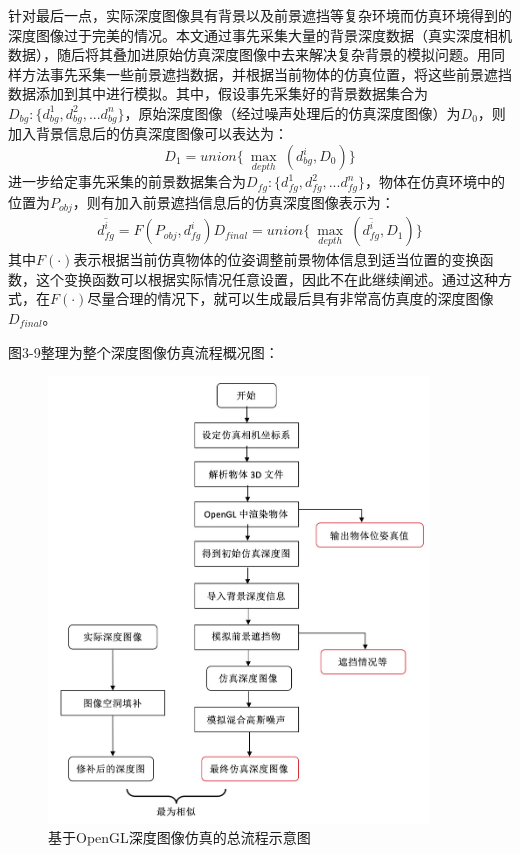针对最后一点，实际深度图像具有背景以及前景遮挡等复杂环境而仿真环境得到的深度图像过于完美的情况。本文通过事先采集大量的背景深度数据（真实深度相机数据），随后将其叠加进原始仿真深度图像中去来解决复杂背景的模拟问题。用同样方法事先采集一些前景遮挡数据，并根据当前物体的仿真位置，将这些前景遮挡数据添加到其中进行模拟。其中，假设事先采集好的背景数据集合为$D_{bg}:\{d_{bg}^1,d_{bg}^2,...d_{bg}^n\}$，原始深度图像（经过噪声处理后的仿真深度图像）为$D_0$，则加入背景信息后的仿真深度图像可以表达为：
\begin{equation}
	D_1=union\{\ \max_{depth}\ (d_{bg}^i, D_0)\}
\end{equation}
进一步给定事先采集的前景数据集合为$D_{fg}:\{d_{fg}^1,d_{fg}^2,...d_{fg}^n\}$，物体在仿真环境中的位置为$P_{obj}$，则有加入前景遮挡信息后的仿真深度图像表示为：
\begin{equation}
\begin{aligned}
	\overline{d_{fg}^i} = F(P_{obj},d_{fg}^i)
	D_{final}=union\{\ \max_{depth}\ (\overline{d_{fg}^i}, D_1)\}
\end{aligned}
\end{equation}
其中$F(\cdot)$表示根据当前仿真物体的位姿调整前景物体信息到适当位置的变换函数，这个变换函数可以根据实际情况任意设置，因此不在此继续阐述。通过这种方式，在$F(\cdot)$尽量合理的情况下，就可以生成最后具有非常高仿真度的深度图像$D_{final}$。

图3-9整理为整个深度图像仿真流程概况图：

\begin{figure}[htb]
	\centering 
	\includegraphics[width=0.9\textwidth]{./mypic/基于OpenGL深度图像仿真的总流程示意图.jpg} 
	\caption{基于OpenGL深度图像仿真的总流程示意图} 
\end{figure}




